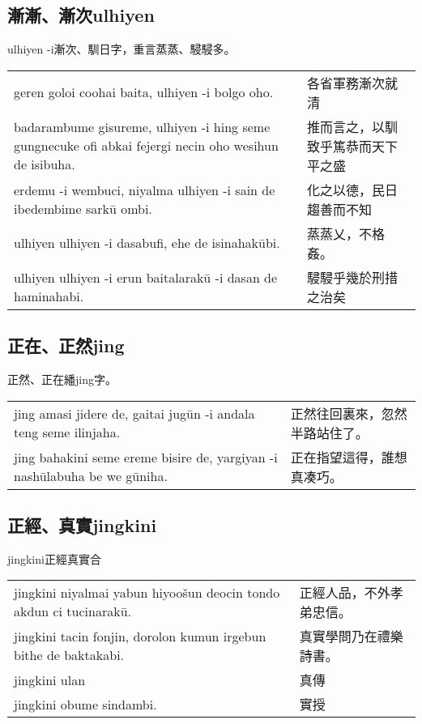 \documentclass{article}
\begin{document}
\subsection{漸漸、漸次ulhiyen}
\noindent ulhiyen -i漸次、馴日字，重言蒸蒸、駸駸多。
\begin{center}
    \begin{tabularx}{\textwidth}{XX}
        geren goloi coohai baita, ulhiyen -i bolgo oho. & 各省軍務漸次就清\\
        badarambume gisureme, ulhiyen -i hing seme gungnecuke ofi abkai fejergi necin oho wesihun de isibuha. & 推而言之，以馴致乎篤恭而天下平之盛\\
        erdemu -i wembuci, niyalma ulhiyen -i sain de ibedembime sark\={u} ombi. & 化之以德，民日趨善而不知\\
        ulhiyen ulhiyen -i dasabufi, ehe de isinahak\={u}bi.& 蒸蒸乂，不格姦。\\
        ulhiyen ulhiyen -i erun baitalarak\={u} -i dasan de haminahabi. & 駸駸乎幾於刑措之治矣
    \end{tabularx}
\end{center}

\subsection{正在、正然jing}
\noindent 正然、正在繙jing字。
\begin{center}
    \begin{tabularx}{\textwidth}{XX}
        jing amasi jidere de, gaitai jug\={u}n -i andala teng seme ilinjaha. & 正然往回裏來，忽然半路站住了。\\
        jing bahakini seme ereme bisire de, yargiyan -i nash\={u}labuha be we g\={u}niha. & 正在指望這得，誰想真凑巧。
    \end{tabularx}
\end{center}

\subsection{正經、真實jingkini}
\noindent jingkini正經真實合
\begin{center}
    \begin{tabularx}{\textwidth}{XX}
        jingkini niyalmai yabun hiyoo\v{s}un deocin tondo akdun ci tucinarak\={u}. & 正經人品，不外孝弟忠信。\\
        jingkini tacin fonjin, dorolon kumun irgebun bithe de baktakabi. & 真實學問乃在禮樂詩書。\\
        jingkini ulan & 真傳\\
        jingkini obume sindambi. & 實授
    \end{tabularx}
\end{center}
\end{document}
